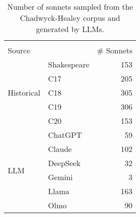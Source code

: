 \begin{table}[H]
  \centering
  \small
  \singlespacing
  \begin{tabular}{llr}
  \toprule
   &  &  \\
  Source &  & \# Sonnets  \\
  \midrule
  \multirow[t]{5}{*}{Historical} & Shakespeare & 153 \\
   & C17 & 205 \\
   & C18 & 305 \\
   & C19 & 306 \\
   & C20 & 153 \\
  \midrule
  \multirow[t]{6}{*}{LLM} & ChatGPT & 59 \\
   & Claude & 102 \\
   & DeepSeek & 32 \\
   & Gemini & 3 \\
   & Llama & 163 \\
   & Olmo & 90 \\
  \bottomrule
  \end{tabular}
  \caption{Number of sonnets sampled from the Chadwyck-Healey corpus and generated by LLMs.}
  \label{tab:num_sonnets_corpus}
\end{table}